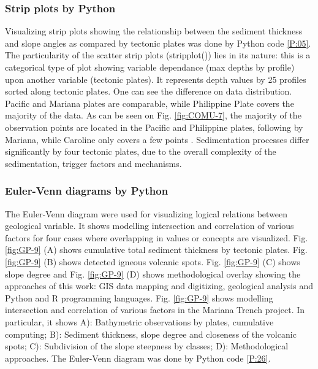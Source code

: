 \documentclass[11pt,a4paper]{report}
\begin{document}
{%
\subsubsection{Strip plots by Python}\label{sssec:Py06}
Visualizing strip plots showing the relationship between the sediment thickness and slope angles as compared by tectonic plates was done by Python code \ref{P:05}. The particularity of the scatter strip plots (stripplot()) lies in its nature: this is a categorical type of plot showing variable dependance (max depths by profile) upon another variable (tectonic plates). It represents depth values by 25 profiles sorted along tectonic plates. One can see the difference on data distribution. Pacific and Mariana plates are comparable, while Philippine Plate covers the majority of the data. As can be seen on Fig. \ref{fig:COMU-7}, the majority of the observation points are located in the Pacific and Philippine plates, following by Mariana, while Caroline only covers a few points \cite{Lemenkova201993}. Sedimentation processes differ significantly by four tectonic plates, due to the overall complexity of the sedimentation, trigger factors and mechanisms. 

\subsubsection{Euler-Venn diagrams by Python}
The Euler-Venn diagram were used for visualizing logical relations between geological variable. It shows modelling intersection and correlation of various factors for four cases where overlapping in values or concepts are visualized. Fig. \ref{fig:GP-9} (A) shows cumulative total sediment thickness by tectonic plates. Fig. \ref{fig:GP-9} (B) shows detected igneous volcanic spots. Fig. \ref{fig:GP-9} (C) shows slope degree and Fig. \ref{fig:GP-9} (D) shows methodological overlay showing the approaches of this work: GIS data mapping and digitizing, geological analysis and Python and R programming languages. Fig. \ref{fig:GP-9} shows modelling intersection and correlation of various factors in the Mariana Trench project. In particular, it shows A): Bathymetric observations by plates, cumulative computing; B): Sediment thickness, slope degree and closeness of the volcanic spots; C): Subdivision of the slope steepness by classes; D): Methodological approaches. The Euler-Venn diagram was done by Python code \ref{P:26}.
	
}
\end{document}
